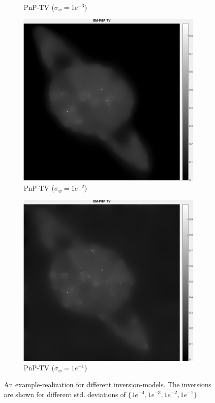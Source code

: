 \documentclass[a4paper, 11pt]{article}
\begin{document}
\begin{figure}[h]
\begin{subfigure}[b]{0.22\textwidth}
        \caption{\tiny PnP-TV ($\sigma_w=1e^{-3}$)}
        \label{fig:PnP-1}
    \end{subfigure}
    \begin{subfigure}[b]{0.22\textwidth}
        \includegraphics[width=\textwidth]{../Figures/PnPReconstructionNoiseSigma1e-2.png}
        \caption{\tiny PnP-TV ($\sigma_w=1e^{-2}$)}
        \label{fig:PnP0}
    \end{subfigure}
    \begin{subfigure}[b]{0.22\textwidth}
        \includegraphics[width=\textwidth]{../Figures/PnPReconstructionNoiseSigma1e-1.png}
        \caption{\tiny PnP-TV ($\sigma_w=1e^{-1}$)}
        \label{fig:PnP1}
    \end{subfigure}
\caption{An example-realization for different inversion-models. The inversions are shown for different std. deviations of $\{1e^{-4},1e^{-3}, 1e^{-2},1e^{-1}\}$.}
\label{fig:inversionModel}
\end{figure}
\end{document}
